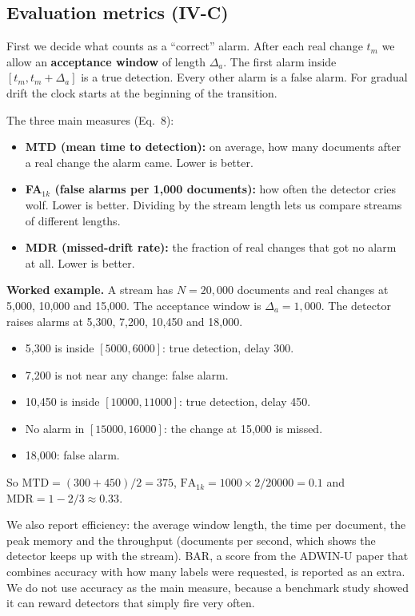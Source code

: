 \documentclass[11pt,a4paper]{article}
\begin{document}
\subsection{Evaluation metrics (IV-C)}

First we decide what counts as a ``correct'' alarm. After each real change $t_m$ we allow an \textbf{acceptance window} of length $\Delta_a$. The first alarm inside $[t_m, t_m+\Delta_a]$ is a true detection. Every other alarm is a false alarm. For gradual drift the clock starts at the beginning of the transition.

The three main measures (Eq.~8):
\begin{itemize}
\item \textbf{MTD (mean time to detection):} on average, how many documents after a real change the alarm came. Lower is better.
\item \textbf{FA$_{1k}$ (false alarms per 1,000 documents):} how often the detector cries wolf. Lower is better. Dividing by the stream length lets us compare streams of different lengths.
\item \textbf{MDR (missed-drift rate):} the fraction of real changes that got no alarm at all. Lower is better.
\end{itemize}

\begin{keybox}
\textbf{Worked example.} A stream has $N=20{,}000$ documents and real changes at 5,000, 10,000 and 15,000. The acceptance window is $\Delta_a=1{,}000$. The detector raises alarms at 5,300, 7,200, 10,450 and 18,000.
\begin{itemize}
\item 5,300 is inside $[5000,6000]$: true detection, delay 300.
\item 7,200 is not near any change: false alarm.
\item 10,450 is inside $[10000,11000]$: true detection, delay 450.
\item No alarm in $[15000,16000]$: the change at 15,000 is missed.
\item 18,000: false alarm.
\end{itemize}
So $\mathrm{MTD}=(300+450)/2=375$, $\mathrm{FA}_{1k}=1000\times2/20000=0.1$ and $\mathrm{MDR}=1-2/3\approx0.33$.
\end{keybox}

We also report efficiency: the average window length, the time per document, the peak memory and the throughput (documents per second, which shows the detector keeps up with the stream). BAR, a score from the ADWIN-U paper that combines accuracy with how many labels were requested, is reported as an extra. We do not use accuracy as the main measure, because a benchmark study showed it can reward detectors that simply fire very often.
\end{document}
